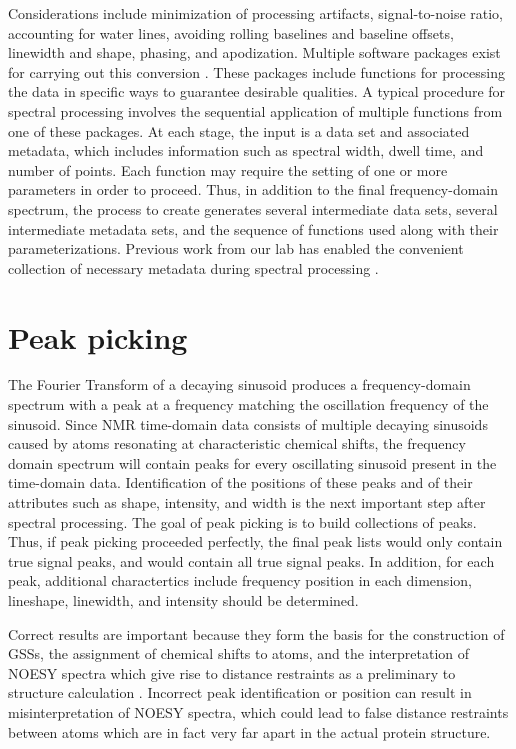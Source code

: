 Considerations include minimization of processing artifacts, signal-to-noise 
ratio, accounting for water lines, avoiding rolling baselines and baseline 
offsets, linewidth and shape, phasing, and apodization.  Multiple software 
packages exist for carrying out this conversion \cite{nmrpipe, rnmrtk}.
These packages include functions for processing the data in specific ways to 
guarantee desirable qualities.  A typical procedure for spectral processing 
involves the sequential application of multiple functions from one of these 
packages.  At each stage, the input is a data set and associated metadata, 
which includes information such as spectral width, dwell time, and number of 
points.  Each function may require the setting of one or more parameters in 
order to proceed.  Thus, in addition to the final frequency-domain spectrum, 
the process to create generates several intermediate data sets, several 
intermediate metadata sets, and the sequence of functions used along with 
their parameterizations.  Previous work from our lab has enabled the 
convenient collection of necessary metadata during spectral 
processing \cite{connjur-wb}.


\section{Peak picking}

The Fourier Transform of a decaying sinusoid produces a frequency-domain 
spectrum with a peak at a frequency matching the oscillation frequency of 
the sinusoid.  Since NMR time-domain data consists of multiple decaying 
sinusoids caused by atoms resonating at characteristic chemical shifts, 
the frequency domain spectrum will contain peaks for every oscillating 
sinusoid present in the time-domain data.  Identification of the positions 
of these peaks and of their attributes such as shape, intensity, and width 
is the next important step after spectral processing.  The goal of peak 
picking is to build collections of peaks.  Thus, if peak picking proceeded 
perfectly, the final peak lists would only contain true signal peaks, and 
would contain all true signal peaks.  
In addition, for each peak, additional charactertics include frequency 
position in each dimension, lineshape, linewidth, and intensity should be 
determined.

Correct results are important because they form the basis for the construction 
of GSSs, the assignment of chemical shifts to atoms, and the interpretation of 
NOESY spectra which give rise to distance restraints as a preliminary to 
structure calculation \cite{guerry2011automated}.  
Incorrect peak identification or position can result 
in misinterpretation of NOESY spectra, which could lead to false distance 
restraints between atoms which are in fact very far apart in the actual 
protein structure.
	
